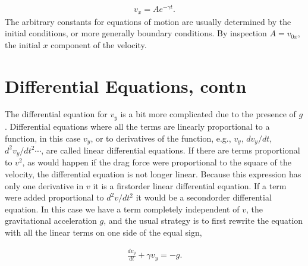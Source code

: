 \documentclass[letterpaper,10pt,english]{sphinxmanual}
\begin{document}
\begin{equation*}
\begin{split}
\begin{equation}
v_x=Ae^{-\gamma t}.
\label{_auto5} \tag{5}
\end{equation}
\end{split}
\end{equation*}
The arbitrary constants for equations of motion are usually determined
by the initial conditions, or more generally boundary conditions. By
inspection \(A=v_{0x}\), the initial \(x\) component of the velocity.


\section{Differential Equations, contn}
\label{\detokenize{chapter1:differential-equations-contn}}
The differential equation for \(v_y\) is a bit more complicated due to
the presence of \(g\). Differential equations where all the terms are
linearly proportional to a function, in this case \(v_y\), or to
derivatives of the function, e.g., \(v_y\), \(dv_y/dt\),
\(d^2v_y/dt^2\cdots\), are called linear differential equations. If
there are terms proportional to \(v^2\), as would happen if the drag
force were proportional to the square of the velocity, the
differential equation is not longer linear. Because this expression
has only one derivative in \(v\) it is a first\sphinxhyphen{}order linear differential
equation. If a term were added proportional to \(d^2v/dt^2\) it would be
a second\sphinxhyphen{}order differential equation.  In this case we have a term
completely independent of \(v\), the gravitational acceleration \(g\), and
the usual strategy is to first rewrite the equation with all the
linear terms on one side of the equal sign,




\begin{equation*}
\begin{split}
\begin{equation}
\frac{dv_y}{dt}+\gamma v_y=-g.
\label{_auto6} \tag{6}
\end{equation}
\end{split}
\end{equation*}
\end{document}
